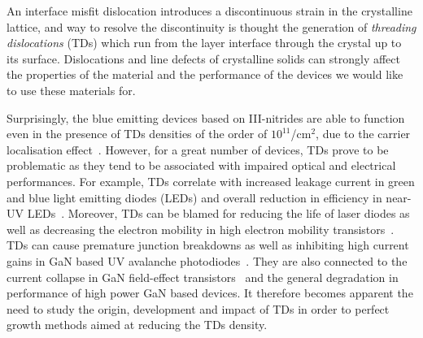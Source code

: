 An interface misfit dislocation introduces a discontinuous strain in the crystalline lattice, and way to resolve the discontinuity is thought the generation of \textit{threading dislocations} (TDs) which run from the layer interface through the crystal up to its surface. Dislocations and line defects of crystalline solids can strongly affect the properties of the material and the performance of the devices we would like to use these materials for.

Surprisingly, the blue emitting devices based on III-nitrides are able to function even in the presence of TDs  densities of the order of $10^{11}$/cm$^2$, due to the carrier localisation effect~\cite{Graham}. However, for a great number of devices, TDs prove to be problematic as they tend to be associated with impaired optical and electrical performances. For example, TDs correlate with increased leakage current in green and blue light emitting diodes (LEDs) \cite{Ferdous} and overall reduction in efficiency in near-UV LEDs~\cite{Kamiyama}. Moreover, TDs can be blamed for reducing the life of laser diodes as well as decreasing the electron mobility in high electron mobility transistors~\cite{Bougrioua}. TDs can cause premature junction breakdowns as well as inhibiting high current gains in GaN based UV avalanche photodiodes~\cite{Limb}. They are also connected to the current collapse in GaN field-effect transistors~\cite{Disanto} and the general degradation in performance of high power GaN based devices. It therefore becomes apparent the need to study the origin, development and impact of TDs in order to perfect growth methods aimed at reducing the TDs density.



